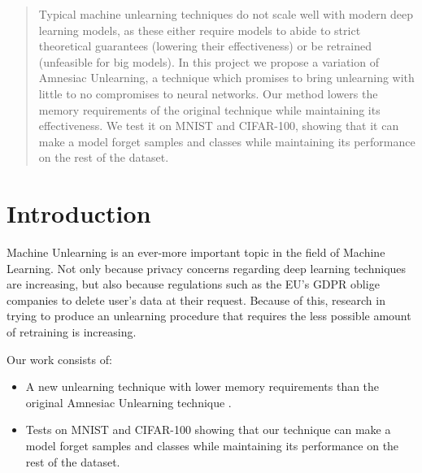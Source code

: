 \documentclass{article}
\begin{document}

\printAffiliationsAndNotice{}

\begin{abstract}
Typical machine unlearning techniques do not scale well with modern deep learning models, as these either require models to abide to strict theoretical guarantees (lowering their effectiveness) or be retrained (unfeasible for big models). In this project we propose a variation of Amnesiac Unlearning, a technique which promises to bring unlearning with little to no compromises to neural networks. Our method lowers the memory requirements of the original technique while maintaining its effectiveness. We test it on MNIST and CIFAR-100, showing that it can make a model forget samples and classes while maintaining its performance on the rest of the dataset.
\end{abstract}
\section{Introduction}
Machine Unlearning is an ever-more important topic in the field of Machine Learning. Not only because privacy concerns regarding deep learning techniques are increasing, but also because regulations such as the EU's GDPR oblige companies to delete user's data at their request. Because of this, research in trying to produce an unlearning procedure that requires the less possible amount of retraining is increasing.

Our work consists of:
\begin{itemize}
    \item A new unlearning technique with lower memory requirements than the original Amnesiac Unlearning technique \cite{graves2021amnesiac}.
    \item Tests on MNIST and CIFAR-100 showing that our technique can make a model forget samples and classes while maintaining its performance on the rest of the dataset.
\end{itemize}
\end{document}
